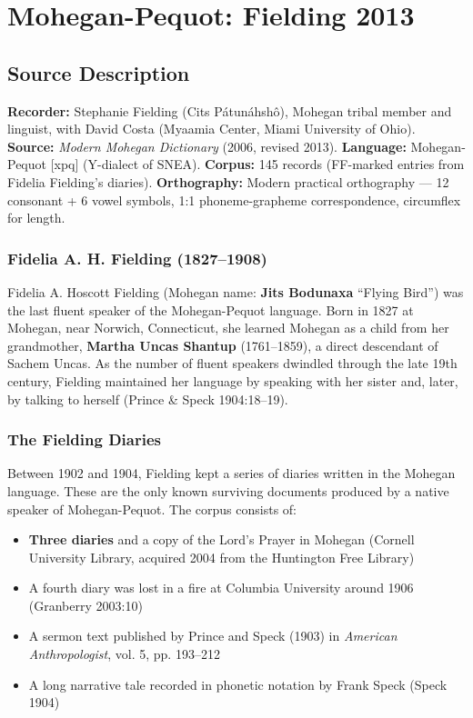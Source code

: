 
\section{Mohegan-Pequot: Fielding 2013}
\label{sec:1364}

\subsection{Source Description}

\textbf{Recorder:} Stephanie Fielding (Cits Pátunáhshô), Mohegan tribal
member and linguist, with David Costa (Myaamia Center, Miami University of
Ohio).
\textbf{Source:} \emph{Modern Mohegan Dictionary} (2006, revised 2013).
\textbf{Language:} Mohegan-Pequot [xpq] (Y-dialect of SNEA).
\textbf{Corpus:} 145 records (FF-marked entries from Fidelia Fielding's
diaries).
\textbf{Orthography:} Modern practical orthography --- 12 consonant + 6 vowel
symbols, 1:1 phoneme-grapheme correspondence, circumflex for length.

\subsubsection{Fidelia A. H. Fielding (1827--1908)}

Fidelia A. Hoscott Fielding (Mohegan name: \textbf{Jits Bodunaxa} ``Flying
Bird'') was the last fluent speaker of the Mohegan-Pequot language. Born in
1827 at Mohegan, near Norwich, Connecticut, she learned Mohegan as a child
from her grandmother, \textbf{Martha Uncas Shantup} (1761--1859), a direct
descendant of Sachem Uncas. As the number of fluent speakers dwindled through
the late 19th century, Fielding maintained her language by speaking with her
sister and, later, by talking to herself (Prince \& Speck 1904:18--19).

\subsubsection{The Fielding Diaries}

Between 1902 and 1904, Fielding kept a series of diaries written in the
Mohegan language. These are the only known surviving documents produced by a
native speaker of Mohegan-Pequot. The corpus consists of:

\begin{itemize}
  \item \textbf{Three diaries} and a copy of the Lord's Prayer in Mohegan
    (Cornell University Library, acquired 2004 from the Huntington Free
    Library)
  \item A fourth diary was lost in a fire at Columbia University around 1906
    (Granberry 2003:10)
  \item A sermon text published by Prince and Speck (1903) in \emph{American
    Anthropologist}, vol. 5, pp. 193--212
  \item A long narrative tale recorded in phonetic notation by Frank Speck
    (Speck 1904)
\end{itemize}


